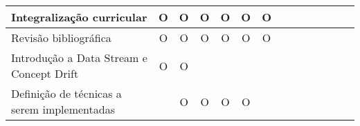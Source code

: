 \begin{table}[!htp]
\begin{threeparttable}[b]
\begin{tabular}{|p{3.1cm}|c|c|c|c|c|c|c|c|c|c|c|c|c|}
Integralização curricular                     & O                                               & O                                               & O                                               & O                                               & O                                               & O                                               &                                               &                                                 &                                                 &                                                 &                                                 &                                                 &                                                 \\ \hline
Revisão bibliográfica                         & O                                               & O                                               & O                                               & O                                               & O                                               & O                                               &                                                &                                                &                                               &                                                 &                                               &                                               &                                                 \\ \hline
Introdução a Data Stream e Concept Drift      & O                                               & O                                               &                                                 &                                                 &                                                 &                                                 &                                                 &                                                 &                                                 &                                                 &                                                 &                                                 &                                                 \\ \hline
Definição de técnicas a serem implementadas   &                                                 & O                                               & O                                               & O                                                & O                                               &                                                 &                                                 &                                                 &                                                 &                                                 &                                                 &                                                 &                                                 \\ \hline

\end{tabular}
\end{threeparttable}
\end{table}
